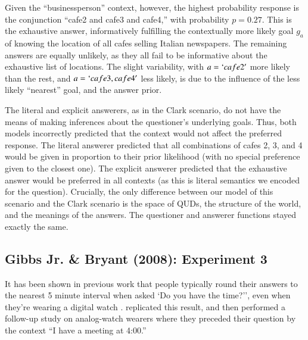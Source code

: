 \documentclass[12pt, floatsintext, jou]{apa6}
\begin{document}
Given the ``businessperson'' context, however, the highest probability response is the conjunction ``cafe2 and cafe3 and cafe4,'' with probability $p = 0.27$. This is the exhaustive answer, informatively fulfilling the contextually more likely goal $g_a$ of knowing the location of all cafes selling Italian newspapers. The remaining answers are equally unlikely, as they all fail to be informative about the exhaustive list of locations. The slight variability, with $a = `cafe2'$ more likely than the rest, and $a = `cafe3, cafe4'$ less likely, is due to the influence of the less likely ``nearest'' goal, and the answer prior.

The literal and explicit answerers, as in the Clark scenario, do not have the means of making inferences about the questioner's underlying goals. Thus, both models incorrectly predicted that the context would not affect the preferred response. The literal answerer predicted that all combinations of cafes 2, 3, and 4 would be given in proportion to their prior likelihood (with no special preference given to the closest one). The explicit answerer predicted that the exhaustive answer would be preferred in all contexts (as this is literal semantics we encoded for the question).  Crucially, the only difference between our model of this scenario and the Clark scenario is the space of QUDs, the structure of the world, and the meanings of the answers. The questioner and answerer functions stayed exactly the same.


\subsection{Gibbs Jr. \& Bryant (2008): Experiment 3}

It has been shown in previous work that people typically round their answers to the nearest 5 minute interval when asked `Do you have the time?'', even when they're wearing a digital watch \cite{DerHenstCarlesSperber02_RelevanceTellingTime}.   replicated this result, and then performed a follow-up study on analog-watch wearers where they preceded their question by the context ``I have a meeting at 4:00.'' 
\end{document}
